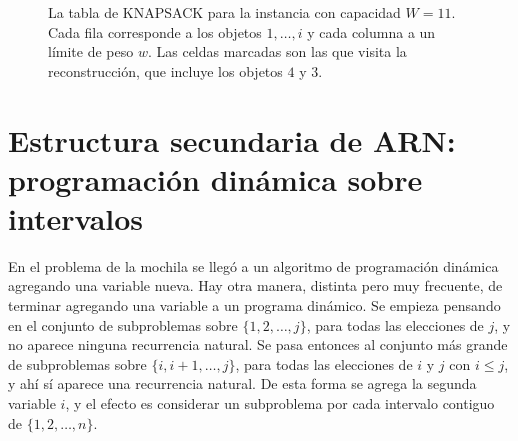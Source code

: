 \documentclass[12pt, spanish, oneside, openany]{book}
\newcommand{\alg}[1]{#1}
\theoremstyle{uprightplain}
\theoremstyle{definition}
\theoremstyle{remark}
\theoremstyle{definition}
\newcommand{\val}{\operatorname{val}}   %
\begin{document}
\begin{figure}[H]
\centering
{}
\caption{La tabla de \alg{KNAPSACK} para la instancia con capacidad $W=11$.
Cada fila corresponde a los objetos $1,\dots,i$ y cada columna a un límite de
peso $w$. Las celdas marcadas son las que visita la reconstrucción, que incluye los
objetos $4$ y $3$.}
\label{fig:dp-mochila-tabla}
\end{figure}


\section{Estructura secundaria de ARN: programación dinámica sobre intervalos}
\label{sec:dp-arn}

En el problema de la mochila se llegó a un algoritmo de programación dinámica agregando una variable nueva. Hay otra manera, distinta pero muy frecuente, de terminar agregando una variable a un programa dinámico. Se empieza pensando en el conjunto de subproblemas sobre $\{1,2,\dots,j\}$, para todas las elecciones de $j$, y no aparece ninguna recurrencia natural. Se pasa entonces al conjunto más grande de subproblemas sobre $\{i,i+1,\dots,j\}$, para todas las elecciones de $i$ y $j$ con $i\le j$, y ahí sí aparece una recurrencia natural. De esta forma se agrega la segunda variable $i$, y el efecto es considerar un subproblema por cada intervalo contiguo de $\{1,2,\dots,n\}$.
\end{document}

